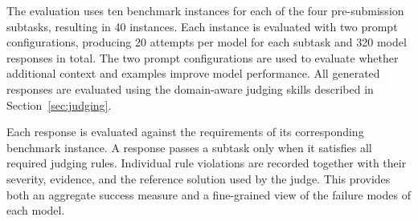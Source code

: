 \documentclass[conference]{IEEEtran}
\begin{document}
The evaluation uses ten benchmark instances for each of the four pre-submission subtasks, resulting in 40 instances. Each instance is evaluated with two prompt configurations, producing 20 attempts per model for each subtask and 320 model responses in total. The two prompt configurations are used to evaluate whether additional context and examples improve model performance. All generated responses are evaluated using the domain-aware judging skills described in Section~\ref{sec:judging}.
 
Each response is evaluated against the requirements of its corresponding benchmark instance. A response passes a subtask only when it satisfies all required judging rules. Individual rule violations are recorded together with their severity, evidence, and the reference solution used by the judge. This provides both an aggregate success measure and a fine-grained view of the failure modes of each model.
 
\end{document}
